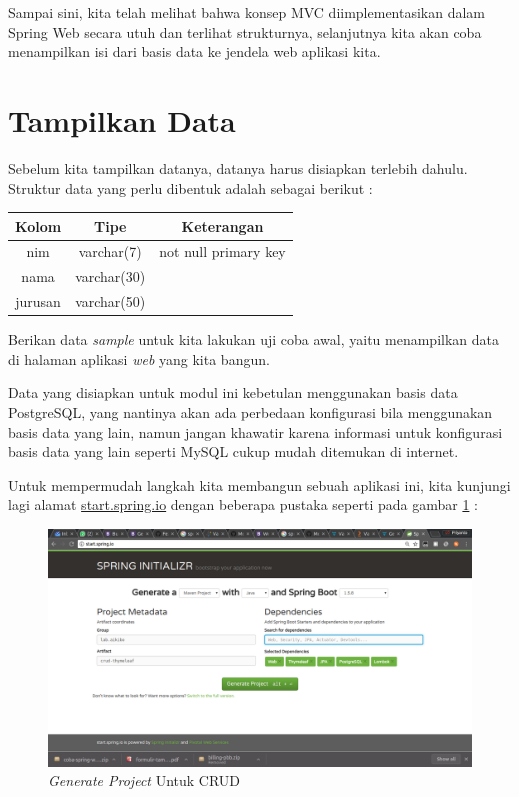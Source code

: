 Sampai sini, kita telah melihat bahwa konsep MVC diimplementasikan dalam Spring Web secara utuh dan terlihat strukturnya, selanjutnya kita akan coba menampilkan isi dari basis data ke jendela web aplikasi kita.

\section{Tampilkan Data}

Sebelum kita tampilkan datanya, datanya harus disiapkan terlebih dahulu. Struktur data yang perlu dibentuk adalah sebagai berikut :

\begin{tabular}{| c | c | c |}
	\hline
	Kolom & Tipe & Keterangan \\
	\hline \hline
	nim & varchar(7) & not null primary key \\
	\hline
	nama & varchar(30) & \\
	\hline
	jurusan & varchar(50) & \\
	\hline
\end{tabular}

Berikan data \textit{sample} untuk kita lakukan uji coba awal, yaitu menampilkan data di halaman aplikasi \textit{web} yang kita bangun.

Data yang disiapkan untuk modul ini kebetulan menggunakan basis data PostgreSQL, yang nantinya akan ada perbedaan konfigurasi bila menggunakan basis data yang lain, namun jangan khawatir karena informasi untuk konfigurasi basis data yang lain seperti MySQL cukup mudah ditemukan di internet.

Untuk mempermudah langkah kita membangun sebuah aplikasi ini, kita kunjungi lagi alamat \url{start.spring.io} dengan beberapa pustaka seperti pada gambar \ref{fig:init-project-crud} :

\begin{figure}[H]
	\centering
	\includegraphics[width=1\textwidth]{./resources/008-init-project-crud}
	\caption{\textit{Generate Project} Untuk CRUD}
	\label{fig:init-project-crud}
\end{figure}

